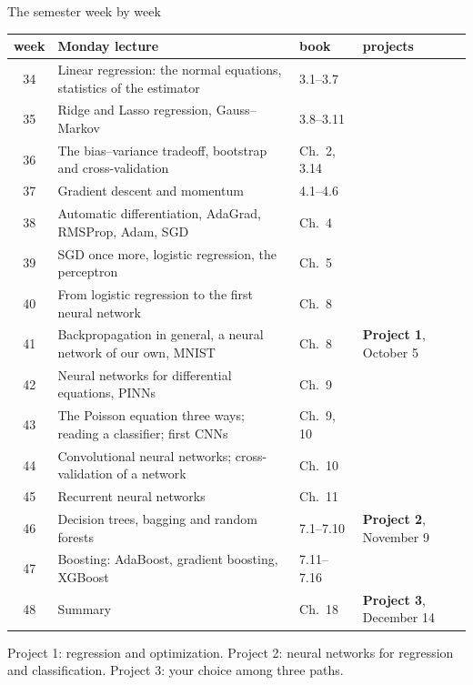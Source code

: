 \documentclass[10pt,aspectratio=169]{beamer}
\begin{document}
\begin{frame}{The semester week by week}
\centering
\scriptsize
\setlength{\tabcolsep}{5pt}
\begin{tabular}{@{}clll@{}}
\toprule
week & Monday lecture & book & projects\\
\midrule
34 & Linear regression: the normal equations, statistics of the estimator & 3.1--3.7 & \\
35 & Ridge and Lasso regression, Gauss--Markov & 3.8--3.11 & \\
36 & The bias--variance tradeoff, bootstrap and cross-validation & Ch.\ 2, 3.14 & \\
37 & Gradient descent and momentum & 4.1--4.6 & \\
38 & Automatic differentiation, AdaGrad, RMSProp, Adam, SGD & Ch.\ 4 & \\
39 & SGD once more, logistic regression, the perceptron & Ch.\ 5 & \\
40 & From logistic regression to the first neural network & Ch.\ 8 & \\
41 & Backpropagation in general, a neural network of our own, MNIST & Ch.\ 8 & \textbf{Project 1}, October 5\\
42 & Neural networks for differential equations, PINNs & Ch.\ 9 & \\
43 & The Poisson equation three ways; reading a classifier; first CNNs & Ch.\ 9, 10 & \\
44 & Convolutional neural networks; cross-validation of a network & Ch.\ 10 & \\
45 & Recurrent neural networks & Ch.\ 11 & \\
46 & Decision trees, bagging and random forests & 7.1--7.10 & \textbf{Project 2}, November 9\\
47 & Boosting: AdaBoost, gradient boosting, XGBoost & 7.11--7.16 & \\
48 & Summary & Ch.\ 18 & \textbf{Project 3}, December 14\\
\bottomrule
\end{tabular}

\smallskip
\footnotesize
Project 1: regression and optimization.  Project 2: neural networks for
regression and classification.  Project 3: your choice among three paths.
\end{frame}
\end{document}
